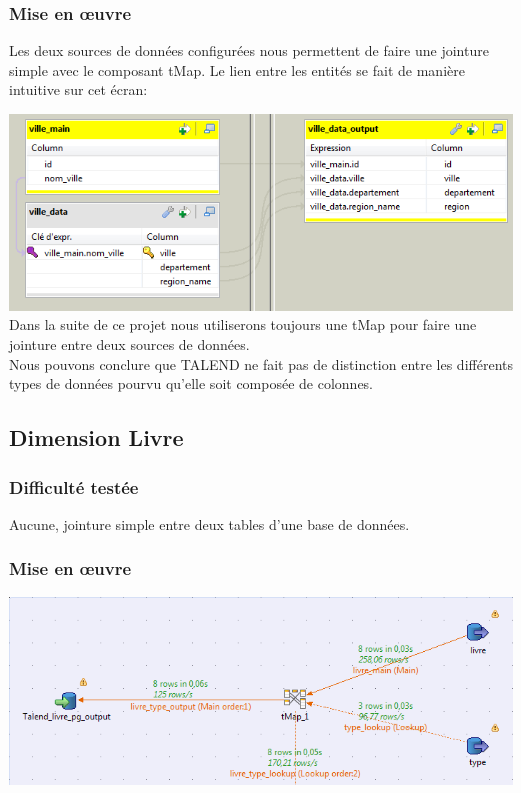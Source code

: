 \subsubsection{Mise en œuvre}
Les deux sources de données configurées nous permettent de faire une jointure simple avec le composant tMap. Le lien entre les entités se fait de manière intuitive sur cet écran:

\includegraphics[scale=0.60]{images/ville_mappingcsv.PNG}\\
Dans la suite de ce projet nous utiliserons toujours une tMap pour faire une jointure entre deux sources de données.\\
Nous pouvons conclure que TALEND ne fait pas de distinction entre les différents types de données pourvu qu'elle soit composée de colonnes.

\subsection{Dimension Livre}
\subsubsection{Difficulté testée}
Aucune, jointure simple entre deux tables d'une base de données.

\subsubsection{Mise en œuvre}
\includegraphics[scale=0.60]{images/dimension_livre.PNG}

